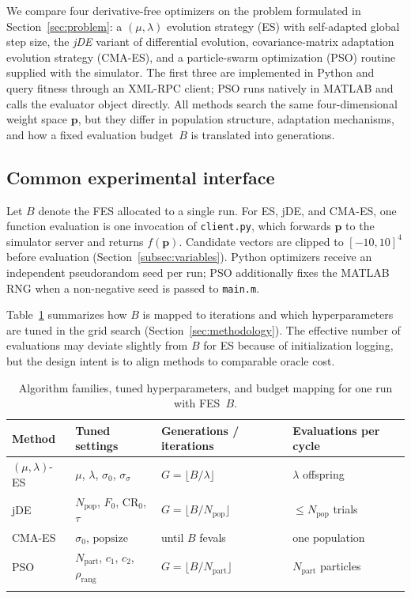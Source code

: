 \documentclass[pdflatex,sn-mathphys-num]{sn-jnl}
\begin{document}
We compare four derivative-free optimizers on the problem formulated in Section~\ref{sec:problem}:
a $(\mu,\lambda)$ evolution strategy (ES) with self-adapted global step size, the \emph{jDE} variant of differential evolution, covariance-matrix adaptation evolution strategy (CMA-ES), and a particle-swarm optimization (PSO) routine supplied with the simulator.
The first three are implemented in Python and query fitness through an XML-RPC client; PSO runs natively in MATLAB and calls the evaluator object directly.
All methods search the same four-dimensional weight space $\mathbf{p}$, but they differ in population structure, adaptation mechanisms, and how a fixed evaluation budget~$B$ is translated into generations.

\subsection{Common experimental interface}\label{subsec:common-interface}

Let $B$ denote the FES allocated to a single run.
For ES, jDE, and CMA-ES, one function evaluation is one invocation of \texttt{client.py}, which forwards $\mathbf{p}$ to the simulator server and returns $f(\mathbf{p})$.
Candidate vectors are clipped to $[-10,10]^4$ before evaluation (Section~\ref{subsec:variables}).
Python optimizers receive an independent pseudorandom seed per run; PSO additionally fixes the MATLAB RNG when a non-negative seed is passed to \texttt{main.m}.

Table~\ref{tab:algo-mapping} summarizes how $B$ is mapped to iterations and which hyperparameters are tuned in the grid search (Section~\ref{sec:methodology}).
The effective number of evaluations may deviate slightly from $B$ for ES because of initialization logging, but the design intent is to align methods to comparable oracle cost.

\begin{table}[h]
\caption{Algorithm families, tuned hyperparameters, and budget mapping for one run with FES~$B$.}\label{tab:algo-mapping}
\begin{tabular}{@{}llll@{}}
\toprule
Method & Tuned settings & Generations / iterations & Evaluations per cycle \\
\midrule
$(\mu,\lambda)$-ES & $\mu$, $\lambda$, $\sigma_0$, $\sigma_\sigma$ & $G=\lfloor B/\lambda\rfloor$ & $\lambda$ offspring \\
jDE & $N_{\mathrm{pop}}$, $F_0$, $\mathrm{CR}_0$, $\tau$ & $G=\lfloor B/N_{\mathrm{pop}}\rfloor$ & $\le N_{\mathrm{pop}}$ trials \\
CMA-ES & $\sigma_0$, $\mathrm{popsize}$ & until $B$ fevals & one population \\
PSO & $N_{\mathrm{part}}$, $c_1$, $c_2$, $\rho_{\mathrm{rang}}$ & $G=\lfloor B/N_{\mathrm{part}}\rfloor$ & $N_{\mathrm{part}}$ particles \\
\botrule
\end{tabular}
\end{table}
\end{document}
